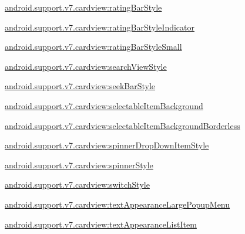 {\ttfamily \hyperlink{classandroid_1_1support_1_1v7_1_1cardview_1_1R_1_1styleable_a80912800f5da21eb5d311d314e104c2a}{android.\+support.\+v7.\+cardview\+:rating\+Bar\+Style}}

{\ttfamily \hyperlink{classandroid_1_1support_1_1v7_1_1cardview_1_1R_1_1styleable_a3224ccfc3225c5afe3441f7efca1270c}{android.\+support.\+v7.\+cardview\+:rating\+Bar\+Style\+Indicator}}

{\ttfamily \hyperlink{classandroid_1_1support_1_1v7_1_1cardview_1_1R_1_1styleable_af7fad53bb6f6481db350fa6bf3d2f4be}{android.\+support.\+v7.\+cardview\+:rating\+Bar\+Style\+Small}}

{\ttfamily \hyperlink{classandroid_1_1support_1_1v7_1_1cardview_1_1R_1_1styleable_a71e0ea183bad4ce323aadbefc4dd0910}{android.\+support.\+v7.\+cardview\+:search\+View\+Style}}

{\ttfamily \hyperlink{classandroid_1_1support_1_1v7_1_1cardview_1_1R_1_1styleable_a2fa09f08a3cd57107f1bbb78f73175ce}{android.\+support.\+v7.\+cardview\+:seek\+Bar\+Style}}

{\ttfamily \hyperlink{classandroid_1_1support_1_1v7_1_1cardview_1_1R_1_1styleable_add903683547560a9e09d1884a4359c03}{android.\+support.\+v7.\+cardview\+:selectable\+Item\+Background}}

{\ttfamily \hyperlink{classandroid_1_1support_1_1v7_1_1cardview_1_1R_1_1styleable_a2515e8712f0532b1b2f41d046b23ac29}{android.\+support.\+v7.\+cardview\+:selectable\+Item\+Background\+Borderless}}

{\ttfamily \hyperlink{classandroid_1_1support_1_1v7_1_1cardview_1_1R_1_1styleable_a62e180c1f60defc3fbbb0ef9727b592e}{android.\+support.\+v7.\+cardview\+:spinner\+Drop\+Down\+Item\+Style}}

{\ttfamily \hyperlink{classandroid_1_1support_1_1v7_1_1cardview_1_1R_1_1styleable_a79aca90da3f26ef28ad85f5c155d9b49}{android.\+support.\+v7.\+cardview\+:spinner\+Style}}

{\ttfamily \hyperlink{classandroid_1_1support_1_1v7_1_1cardview_1_1R_1_1styleable_ae03f65b3221dfdd71687a7d31d9a7103}{android.\+support.\+v7.\+cardview\+:switch\+Style}}

{\ttfamily \hyperlink{classandroid_1_1support_1_1v7_1_1cardview_1_1R_1_1styleable_afe291a8800123e67953b2ed9511c4a9a}{android.\+support.\+v7.\+cardview\+:text\+Appearance\+Large\+Popup\+Menu}}

{\ttfamily \hyperlink{classandroid_1_1support_1_1v7_1_1cardview_1_1R_1_1styleable_a8f72667dec9ee05cdbf2e2619848768c}{android.\+support.\+v7.\+cardview\+:text\+Appearance\+List\+Item}}

